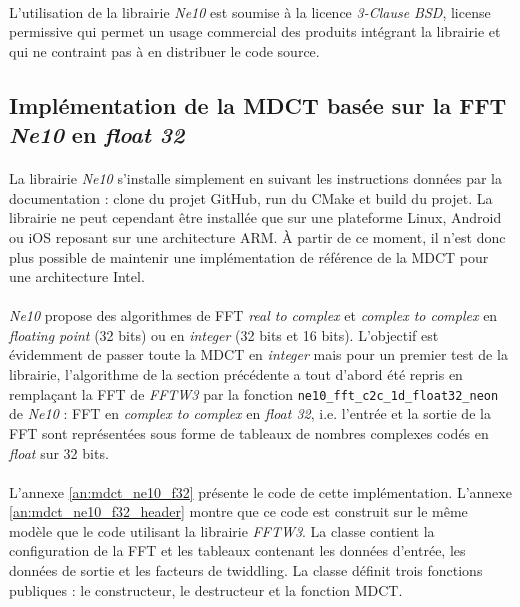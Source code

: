 \documentclass{article}
\begin{document}
    \paragraph{}
    L'utilisation de la librairie \emph{Ne10} est soumise à la licence \emph{3-Clause BSD}, license permissive qui permet un usage commercial des produits intégrant la librairie et qui ne contraint pas à en distribuer le code source\cite{BSD}.

    \subsection{Implémentation de la MDCT basée sur la FFT \emph{Ne10} en \emph{float 32}}
    \paragraph{}
    La librairie \emph{Ne10} s'installe simplement en suivant les instructions données par la documentation : clone du projet GitHub, run du CMake et build du projet\cite{Ne10}. La librairie ne peut cependant être installée que sur une plateforme Linux, Android ou iOS reposant sur une architecture ARM. À partir de ce moment, il n'est donc plus possible de maintenir une implémentation de référence de la MDCT pour une architecture Intel.

    \paragraph{}
    \emph{Ne10} propose des algorithmes de FFT \emph{real to complex} et \emph{complex to complex} en \emph{floating point} (32 bits) ou en \emph{integer} (32 bits et 16 bits). L'objectif est évidemment de passer toute la MDCT en \emph{integer} mais pour un premier test de la librairie, l'algorithme de la section précédente a tout d'abord été repris en remplaçant la FFT de \emph{FFTW3} par la fonction \texttt{ne10\_fft\_c2c\_1d\_float32\_neon} de \emph{Ne10} : FFT en \emph{complex to complex} en \emph{float 32}, i.e. l'entrée et la sortie de la FFT sont représentées sous forme de tableaux de nombres complexes codés en \emph{float} sur 32 bits.

    \paragraph{}
    L'annexe \ref{an:mdct_ne10_f32} présente le code de cette implémentation. L'annexe \ref{an:mdct_ne10_f32_header} montre que ce code est construit sur le même modèle que le code utilisant la librairie \emph{FFTW3}. La classe contient la configuration de la FFT et les tableaux contenant les données d'entrée, les données de sortie et les facteurs de twiddling. La classe définit trois fonctions publiques : le constructeur, le destructeur et la fonction MDCT.
\end{document}
